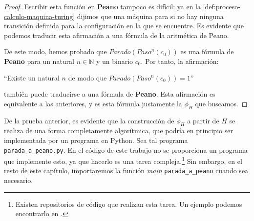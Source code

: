 \begin{proof}
Escribir esta función en \textbf{Peano} tampoco es difícil: ya en la \cref{def:proceso-calculo-maquina-turing} dijimos que una máquina para si no hay ninguna transición definida para la configuración en la que se encuentre. Es evidente que podemos traducir esta afirmación a una fórmula de la aritmética de Peano.

De este modo, hemos probado que $Parado(Paso^n(c_0))$ es una fórmula de \textbf{Peano} para un natural $n\in\mathbb{N}$ y un binario $c_0$. Por tanto, la afirmación:
\begin{adjustwidth}{30pt}{}
    ``Existe un natural $n$ de modo que $Parado(Paso^n(c_0))=1$''
\end{adjustwidth}
también puede traducirse a una fórmula de \textbf{Peano}. Esta afirmación es equivalente a las anteriores, y es esta fórmula justamente la $\phi_H$ que buscamos.
\end{proof}

De la prueba anterior, es evidente que la construcción de $\phi_H$ a partir de $H$ se realiza de una forma completamente algorítmica, que podría en principio ser implementada por un programa en Python. Sea tal programa \texttt{parada\_a\_peano.py}. En el código de este trabajo no se proporciona un programa que implemente esto, ya que hacerlo es una tarea compleja.\footnote{Existen repositorios de código que realizan esta tarea. Un ejemplo podemos encontrarlo en \cite{Henderson2013}.} Sin embargo, en el resto de este capítulo, importaremos la función \emph{main} \texttt{parada\_a\_peano} cuando sea necesario.

